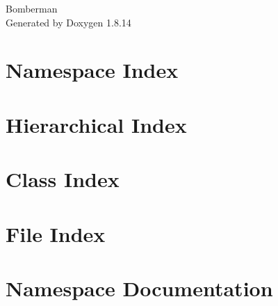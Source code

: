 \documentclass[twoside]{book}
\newcommand{\+}{\discretionary{\mbox{\scriptsize$\hookleftarrow$}}{}{}}
\newcommand{\clearemptydoublepage}{%
  \newpage{\pagestyle{empty}\cleardoublepage}%
}
\begin{document}
\hypersetup{pageanchor=false,
             bookmarksnumbered=true,
             pdfencoding=unicode
            }
\begin{titlepage}
\vspace*{7cm}
\begin{center}%
{\Large Bomberman }\\
\vspace*{1cm}
{\large Generated by Doxygen 1.8.14}\\
\end{center}
\end{titlepage}
\clearemptydoublepage
{}
\tableofcontents
\clearemptydoublepage
{}
\hypersetup{pageanchor=true}

\chapter{Namespace Index}

\chapter{Hierarchical Index}

\chapter{Class Index}

\chapter{File Index}

\chapter{Namespace Documentation}










\end{document}
